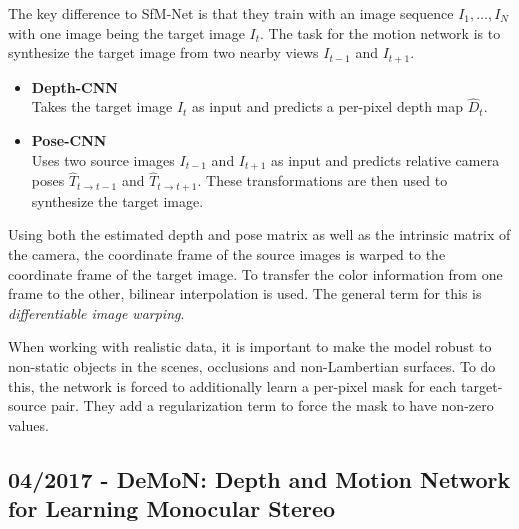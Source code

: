 		The key difference to SfM-Net is that they train with an image sequence $I_1, \dots, I_N$ with one image being the target image $I_t$.
		The task for the motion network is to synthesize the target image from two nearby views $I_{t - 1}$ and $I_{t + 1}$.
		\begin{itemize}
			\item \textbf{Depth-CNN}
				\\
				Takes the target image $I_t$ as input and predicts a per-pixel depth map $\hat{D}_t$.
			\item \textbf{Pose-CNN}
				\\
				Uses two source images $I_{t - 1}$ and $I_{t + 1}$ as input and predicts relative camera poses $\hat{T}_{t \rightarrow t - 1}$ and $\hat{T}_{t \rightarrow t + 1}$. 
				These transformations are then used to synthesize the target image.
		\end{itemize}
		Using both the estimated depth and pose matrix as well as the intrinsic matrix of the camera, the coordinate frame of the source images is warped to the coordinate frame of the target image.
		To transfer the color information from one frame to the other, bilinear interpolation is used.
		The general term for this is \emph{differentiable image warping}.
		
		When working with realistic data, it is important to make the model robust to non-static objects in the scenes, occlusions and non-Lambertian surfaces.
		To do this, the network is forced to additionally learn a per-pixel mask for each target-source pair.
		They add a regularization term to force the mask to have non-zero values.
		
	\subsection{04/2017 - DeMoN: Depth and Motion Network for Learning Monocular Stereo}
		
